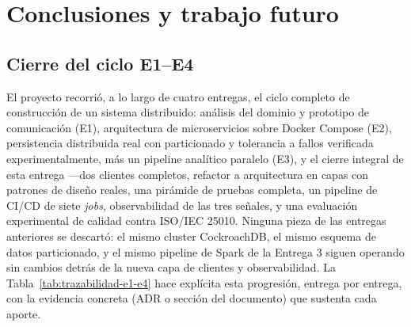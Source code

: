 \section{Conclusiones y trabajo futuro}
\label{sec:conclusiones-e4}

\subsection{Cierre del ciclo E1--E4}

El proyecto recorrió, a lo largo de cuatro entregas, el ciclo completo de construcción de un
sistema distribuido: análisis del dominio y prototipo de comunicación (E1), arquitectura de
microservicios sobre Docker Compose (E2), persistencia distribuida real con particionado y
tolerancia a fallos verificada experimentalmente, más un pipeline analítico paralelo (E3), y el
cierre integral de esta entrega —dos clientes completos, refactor a arquitectura en capas con
patrones de diseño reales, una pirámide de pruebas completa, un pipeline de CI/CD de siete
\emph{jobs}, observabilidad de las tres señales, y una evaluación experimental de calidad contra
ISO/IEC 25010. Ninguna pieza de las entregas anteriores se descartó: el mismo cluster
CockroachDB, el mismo esquema de datos particionado, y el mismo pipeline de Spark de la Entrega 3
siguen operando sin cambios detrás de la nueva capa de clientes y observabilidad. La
Tabla~\ref{tab:trazabilidad-e1-e4} hace explícita esta progresión, entrega por entrega, con la
evidencia concreta (ADR o sección del documento) que sustenta cada aporte.

